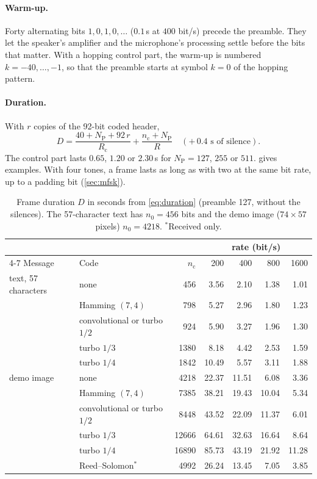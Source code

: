 \documentclass[11pt,a4paper]{article}
\newcommand{\Rc}{R_{\mathrm{c}}}
\newcommand{\NP}{N_{\mathrm{P}}}
\newcommand{\nc}{n_{\mathrm{c}}}
\newcommand{\nz}{n_{0}}
\theoremstyle{remark}
\begin{document}
\paragraph{Warm-up.}
Forty alternating bits $1,0,1,0,\dots$ ($0.1$\,s at $400$ bit/s) precede the preamble.
They let the speaker's amplifier and the microphone's processing settle before the bits that matter.
With a hopping control part, the warm-up is numbered $k = -40, \dots, -1$, so that the preamble starts at symbol $k=0$ of the hopping pattern.

\paragraph{Duration.}
With $r$ copies of the 92-bit coded header,
\begin{equation}
D = \frac{40 + \NP + 92\,r}{\Rc} + \frac{\nc + \NP}{R} \quad (+\,0.4\text{ s of silence}).
\label{eq:duration}
\end{equation}
The control part lasts $0.65$, $1.20$ or $2.30$\,s for $\NP = 127$, $255$ or $511$.
 gives examples. With four tones, a frame lasts as long as with two at the same bit rate, up to a padding bit (\cref{sec:mfsk}).

\begin{table}[ht]
\centering
\caption{Frame duration $D$ in seconds from \cref{eq:duration} (preamble 127, without the silences). The 57-character text has $\nz = 456$ bits and the demo image ($74\times57$ pixels) $\nz = 4218$. $^{\ast}$Received only.}
\label{tab:durations}
\small
\begin{tabular}{llrrrrr}
\toprule
& & & \multicolumn{4}{c}{rate (bit/s)}\\
\cmidrule(lr){4-7}
Message & Code & $\nc$ & 200 & 400 & 800 & 1600\\
\midrule
text, 57 characters & none & 456 & 3.56 & 2.10 & 1.38 & 1.01\\
 & Hamming $(7,4)$ & 798 & 5.27 & 2.96 & 1.80 & 1.23\\
 & convolutional or turbo $1/2$ & 924 & 5.90 & 3.27 & 1.96 & 1.30\\
 & turbo $1/3$ & 1380 & 8.18 & 4.42 & 2.53 & 1.59\\
 & turbo $1/4$ & 1842 & 10.49 & 5.57 & 3.11 & 1.88\\
\midrule
demo image & none & 4218 & 22.37 & 11.51 & 6.08 & 3.36\\
 & Hamming $(7,4)$ & 7385 & 38.21 & 19.43 & 10.04 & 5.34\\
 & convolutional or turbo $1/2$ & 8448 & 43.52 & 22.09 & 11.37 & 6.01\\
 & turbo $1/3$ & 12666 & 64.61 & 32.63 & 16.64 & 8.64\\
 & turbo $1/4$ & 16890 & 85.73 & 43.19 & 21.92 & 11.28\\
 & Reed--Solomon$^{\ast}$ & 4992 & 26.24 & 13.45 & 7.05 & 3.85\\
\bottomrule
\end{tabular}
\end{table}
\end{document}
